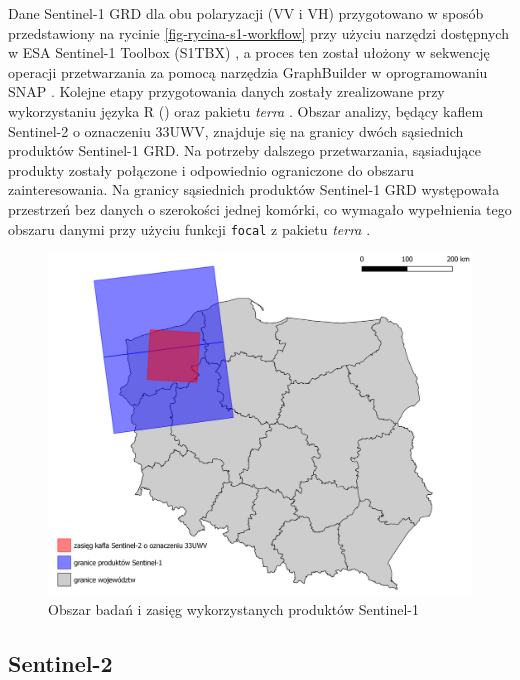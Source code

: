 \documentclass{amuthesis}
\begin{document}
Dane Sentinel-1 GRD dla obu polaryzacji (VV i VH) przygotowano w sposób
przedstawiony na rycinie \ref{fig-rycina-s1-workflow} przy użyciu
narzędzi dostępnych w ESA Sentinel-1 Toolbox (S1TBX) \autocite{s1tbx}, a
proces ten został ułożony w sekwencję operacji przetwarzania za pomocą
narzędzia GraphBuilder w oprogramowaniu SNAP \autocite{snap}. Kolejne
etapy przygotowania danych zostały zrealizowane przy wykorzystaniu
języka R (\textcite{R-base}) oraz pakietu \emph{terra}
\autocite{R-terra}. Obszar analizy, będący kaflem Sentinel-2 o
oznaczeniu 33UWV, znajduje się na granicy dwóch sąsiednich produktów
Sentinel-1 GRD. Na potrzeby dalszego przetwarzania, sąsiadujące produkty
zostały połączone i odpowiednio ograniczone do obszaru zainteresowania.
Na granicy sąsiednich produktów Sentinel-1 GRD występowała przestrzeń
bez danych o szerokości jednej komórki, co wymagało wypełnienia tego
obszaru danymi przy użyciu funkcji \texttt{focal} z pakietu \emph{terra}
\autocite{R-terra}.

\begin{figure}[t]

{\centering \includegraphics[width=1\textwidth,height=\textheight]{figures/sen1_extents.png}

}

\caption{\label{fig-rycina-s1-extents}Obszar badań i zasięg
wykorzystanych produktów Sentinel-1}

\end{figure}

\hypertarget{sec-processing-s2}{%
\subsection{Sentinel-2}\label{sec-processing-s2}}
\end{document}
